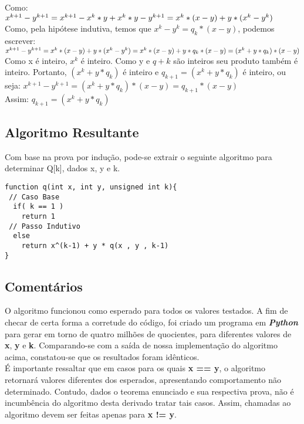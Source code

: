 \documentclass[twoside]{article}
\begin{document}
\begin{multicols}{2}
Como:\\
$x^{k+1}-y^{k+1} =\\ x^{k+1}-x^k*y + x^k*y - y^{k+1} =\\ x^k*(x-y)+y*(x^k-y^k)$\\

Como, pela hipótese indutiva, temos que $x^k-y^k = q_k * (x-y)$, podemos escrever:\\
$x^{k+1}-y^{k+1} =\\ x^k*(x-y)+y*(x^k-y^k) =\\ x^k*(x-y) + y * q_k * (x-y) =\\ (x^k+y*q_k)*(x-y)$\\

Como x é inteiro, $x^k$ é inteiro. Como y e $q+ k$ são inteiros seu produto também é inteiro. Portanto, $(x^k + y*q_k)$ é inteiro e $q_{k+1} = (x^k+y*q_k)$ é inteiro, ou seja: $x^{k+1}-y^{k+1} = (x^k+y*q_k)*(x-y) = q_{k+1}*(x-y)$\\

Assim: $q_{k+1}= (x^k+y*q_k)$\\

\subsection{ Algoritmo Resultante }
\indent Com base na prova por indução, pode-se extrair o seguinte algoritmo para determinar Q[k], dados x, y e k.

\begin{lstlisting}
function q(int x, int y, unsigned int k){
 // Caso Base
  if( k == 1 )
    return 1
 // Passo Indutivo
  else
    return x^(k-1) + y * q(x , y , k-1)  
}
\end{lstlisting}

\subsection{ Comentários }

\indent O algoritmo funcionou como esperado para todos os valores testados. A fim de checar de certa forma a corretude do código, foi criado um programa em \textbf{\textit{Python}} para gerar em torno de quatro milhões de quocientes, para diferentes valores de \textbf{x}, \textbf{y} e \textbf{k}. Comparando-se com a saída de nossa implementação do algoritmo acima, constatou-se que os resultados foram idênticos.\\

\indent É importante ressaltar que em casos para os quais \textbf{x == y}, o algoritmo retornará valores diferentes dos esperados, apresentando comportamento não determinado. Contudo, dados o teorema enunciado e sua respectiva prova, não é incumbência do algoritmo desta derivado tratar tais casos. Assim, chamadas ao algoritmo devem ser feitas apenas para \textbf{x != y}.\\


\end{multicols}
\end{document}
